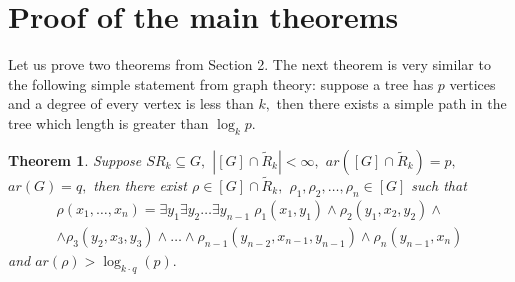 \documentclass{au}
\theoremstyle{plain}
\newtheorem{theorem}{Theorem}
\theoremstyle{definition}
\theoremstyle{remark}
\numberwithin{equation}{section}
\begin{document}
\section{Proof of the main theorems}

Let us prove two theorems from Section 2.
The next theorem is very similar to the following simple statement from graph theory:
suppose a tree has $p$ vertices and a degree of every vertex is less than $k,$ 
then there exists a simple path in the tree which length is greater than $\log_{k}p.$

\setcounter{backup}{\value{theorem}}
\setcounter{theorem}{\value{dveteoremy}}

\begin{theorem}

Suppose $SR_{k}\subseteq G,$
$|[G]\cap \widetilde R_{k}|<\infty,$
$ar([G]\cap \widetilde R_{k})=p,$
$ar(G)=q,$
then there exist $\rho \in [G]\cap \widetilde R_{k},$
$\rho_{1},\rho_{2},\ldots,\rho_{n}\in [G]$
such that
\begin{multline*}\rho(x_{1},\ldots,x_{n}) = \exists y_{1}\exists y_{2}\ldots\exists y_{n-1}\;
\rho_{1}(x_{1},y_{1})\wedge
\rho_{2}(y_{1},x_{2},y_{2})\wedge \\ \wedge
\rho_{3}(y_{2},x_{3},y_{3})\wedge \ldots \wedge
\rho_{n-1}(y_{n-2},x_{n-1},y_{n-1})\wedge
\rho_{n}(y_{n-1},x_{n})
\end{multline*}
and
$ar(\rho)>\log_{k\cdot q}(p).$

\end{theorem}
\end{document}
